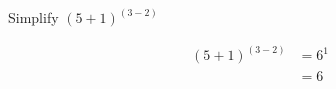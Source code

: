 \documentclass[crop=false,class=book,oneside]{standalone}
\begin{document}
            \hfill
            \begin{minipage}[t]{0.49\textwidth}
                \begin{problem}
                    Simplify $(5+1)^{(3-2)}$
                \end{problem}
                \begin{fsolution}
                    \begin{align*}
                        (5+1)^{(3-2)}&=6^{1}\\
                        &=\boxed{6}\\
                        &\\
                        &
                    \end{align*}
                \end{fsolution}
            \end{minipage}
\end{document}
